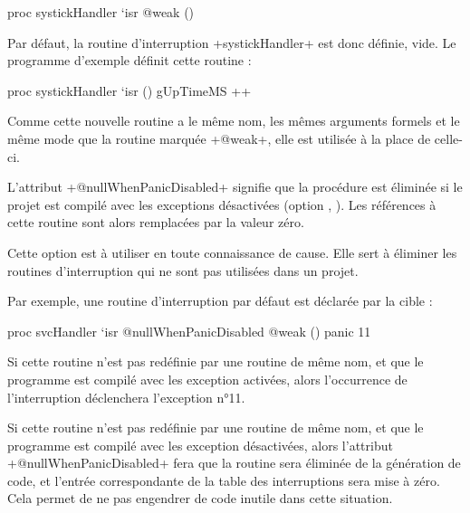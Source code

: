 \begin{PLM}
proc systickHandler `isr @weak () {
}
\end{PLM}

Par défaut, la routine d'interruption \plm+systickHandler+ est donc définie, vide. Le programme d'exemple définit cette routine :

\begin{PLM}
proc systickHandler `isr () {
  gUpTimeMS ++
}
\end{PLM}

Comme cette nouvelle routine a le même nom, les mêmes arguments formels et le même mode que la routine marquée \plm+@weak+, elle est utilisée à la place de celle-ci.







L'attribut \plm+@nullWhenPanicDisabled+ signifie que la procédure est éliminée si le projet est compilé avec les exceptions désactivées (option , ). Les références à cette routine sont alors remplacées par la valeur zéro.

Cette option est à utiliser en toute connaissance de cause. Elle sert à éliminer les routines d'interruption qui ne sont pas utilisées dans un projet.

Par exemple, une routine d'interruption par défaut est déclarée par la cible :

\begin{PLM}
proc svcHandler `isr @nullWhenPanicDisabled @weak () {
  panic 11
}
\end{PLM}

Si cette routine n'est pas redéfinie par une routine de même nom, et que le programme est compilé avec les exception activées, alors l'occurrence de l'interruption déclenchera l'exception n°11.

Si cette routine n'est pas redéfinie par une routine de même nom, et que le programme est compilé avec les exception désactivées, alors l'attribut \plm+@nullWhenPanicDisabled+ fera que la routine sera éliminée de la génération de code, et l'entrée correspondante de la table des interruptions sera mise à zéro. Cela permet de ne pas engendrer de code inutile dans cette situation.

 





